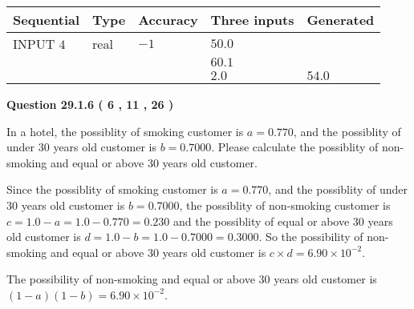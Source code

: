 \documentclass[12pt]{article}
\begin{document}
   
  
  
\noindent\begin{tabular}{|l|l|l|l|l|}
\hline
 Sequential & Type & Accuracy & Three inputs & Generated \\ 
\hline
 
 
  INPUT $            4 $ & real & $           -1  $ & $
 50.0
  $ & \\
  & & &  $
 60.1
  $ & \\
  & & &  $
 2.0
 $ & $ 54.0 $ 
 \\  \hline  
 \end{tabular}
   
   
  
\vspace{0.2in}
  
{\textbf{\Large{Question
29.1.6 
 (           6 ,          11 ,          26 )
}}}
  
  
In a hotel, the possiblity of  %
smoking customer is
$a =  %
0.770$, and the possiblity of  %
 under 30 years old customer is $ b =  %
0.7000$.
Please calculate the possiblity of  %
 non-smoking and  %
equal or above 30 years old customer.
 
 
 
\noindent{}
 
 

Since the possiblity of  %
smoking customer is $ a =  %
0.770 $,
and the possiblity of  %
 under 30 years old customer is $ b =  %
0.7000 $,
the possiblity of  %
non-smoking customer is $ c = 1.0 - a = 1.0 -
0.770
=  %
0.230 $ and the possiblity of  %
equal or above 30 years old
customer is $ d = 1.0 - b = 1.0 -  %
0.7000 =  %
0.3000  $.
So the possibility of  %
 non-smoking and  %
equal or above 30 years old
customer is $ c \times d =  %
6.90 \times 10^{-2} $.
 
 
 
\noindent{}
 
 

 
 
 
\noindent{}
 
 

The possibility of  %
 non-smoking and  %
equal or above 30 years old
customer is $ (1-a)(1-b) =  %
6.90 \times 10^{-2} $.
 
 
\noindent{}
 
\end{document}
